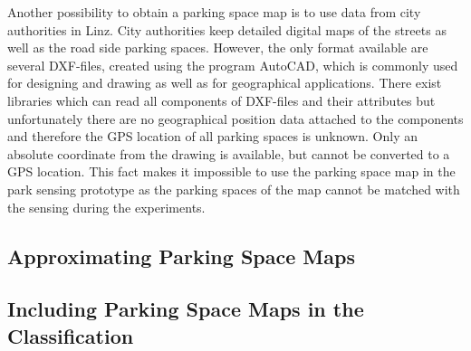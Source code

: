 Another possibility to obtain a parking space map is to use data from city authorities in Linz. City authorities keep detailed digital maps of the streets as well as the road side parking spaces. However, the only format available are several DXF-files, created using the program AutoCAD, which is commonly used for designing and drawing as well as for geographical applications. There exist libraries which can read all components of DXF-files and their attributes but unfortunately there are no geographical position data attached to the components and therefore the GPS location of all parking spaces is unknown. Only an absolute coordinate from the drawing is available, but cannot be converted to a GPS location. This fact makes it impossible to use the parking space map in the park sensing prototype as the parking spaces of the map cannot be matched with the sensing during the experiments.



\subsection{Approximating Parking Space Maps}



\subsection{Including Parking Space Maps in the Classification}





